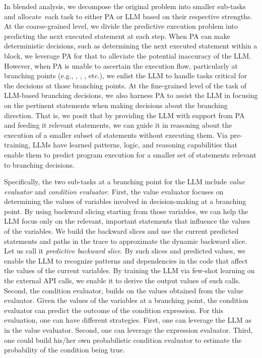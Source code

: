 In blended analysis, we decompose the original problem into smaller sub-tasks and allocate~each task to either PA or LLM based on their respective strengths. At the coarse-grained level, we divide the predictive execution problem into predicting the next executed statement at each step. When PA can make deterministic decisions, such as determining the next executed statement within a block, we leverage PA for that to alleviate the potential inaccuracy of the LLM. However, when PA is unable to ascertain the execution flow, particularly at branching points (e.g., , , , etc.), we enlist the LLM to handle tasks critical for the decisions at those branching points. At the fine-grained level of the task of LLM-based branching decisions, we also harness PA to assist the LLM in focusing on the pertinent statements when making decisions about the branching direction. That is, we posit that by providing the LLM with support from PA and feeding it relevant statements, we can guide it in reasoning about the execution of a smaller subset of statements without executing them. Via pre-training, LLMs have learned patterns, logic, and reasoning capabilities that enable them to predict program execution for a smaller set of statements relevant to branching decisions.

Specifically, the two sub-tasks at a branching point for the LLM
include {\em value evaluator} and {\em condition evaluator}. First, the value
evaluator focuses on determining the values of variables involved in
decision-making at a branching point. By using backward slicing
starting from those variables, we can help the LLM focus only on the
relevant, important statements that influence the values of the
variables. We build the backward slices and use the current predicted
statements and paths in the trace to approximate the dynamic backward
slice. Let us call it {\em predictive backward slice}. By such slices
and predicted values, we enable the LLM to recognize patterns and
dependencies in the code that affect the values of the current
variables. By training the LLM via few-shot learning on the external
API calls, we enable it to derive the output values of such calls.
Second, the condition evaluator, builds on the values obtained from
the value evaluator. Given the values of the variables at a branching
point, the condition evaluator can predict the outcome of the
condition expression. For this evaluation, one can have different
strategies. First, one can leverage the LLM as in the value
evaluator. Second, one can leverage the expression evaluator. Third,
one could build his/her own probabilistic condition evaluator to
estimate the probability of the condition being true.



